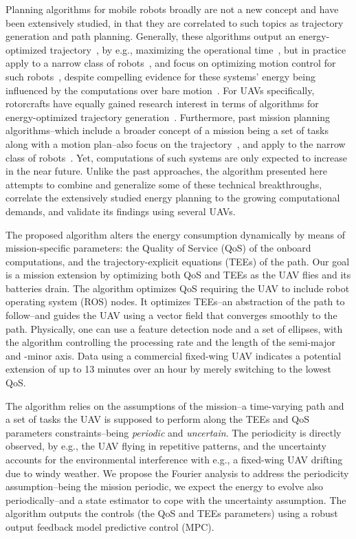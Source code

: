 \documentclass[letterpaper,10pt,conference]{ieeeconf}
\begin{document}
Planning algorithms for mobile robots broadly are not a new concept and have been extensively studied, in that they are correlated to such topics as trajectory generation and path planning. Generally, these algorithms output an energy-optimized trajectory~\cite{mei2004energy}, by e.g., maximizing the operational time~\cite{wahab2015energy}, but in practice apply to a narrow class of robots~\cite{kim2005energy}, and focus on optimizing motion control for such robots~\cite{kim2008minimum}, despite compelling evidence for these systems' energy being influenced by the computations over bare motion~\cite{mei2005case}. For UAVs specifically, rotorcrafts have equally gained research interest in terms of algorithms for energy-optimized trajectory generation~\cite{morbidi2016minimum,kreciglowa2017energy}. Furthermore, past mission planning algorithms--which include a broader concept of a mission being a set of tasks along with a motion plan--also focus on the trajectory~\cite{mei2005case,mei2006deployment}, and apply to the narrow class of robots~\cite{sadrpour2013mission,sadrpour2013experimental}. Yet, computations of such systems are only expected to increase in the near future. Unlike the past approaches, the algorithm presented here attempts to combine and generalize some of these technical breakthroughs, correlate the extensively studied energy planning to the growing computational demands, and validate its findings using several UAVs.

The proposed algorithm alters the energy consumption dynamically by means of mission-specific parameters: the Quality of Service (QoS) of the onboard computations, and the trajectory-explicit equations (TEEs) of the path. Our goal is a mission extension by optimizing both QoS and TEEs as the UAV flies and its batteries drain. The algorithm optimizes QoS requiring the UAV to include robot operating system (ROS) nodes. It optimizes TEEs--an abstraction of the path to follow--and guides the UAV using a vector field that converges smoothly to the path. Physically, one can use a feature detection node and a set of ellipses, with the algorithm controlling the processing rate and the length of the semi-major and -minor axis. Data using a commercial fixed-wing UAV indicates a potential extension of up to 13 minutes over an hour by merely switching to the lowest QoS.

The algorithm relies on the assumptions of the mission--a time-varying path and a set of tasks the UAV is supposed to perform along the TEEs and QoS parameters constraints--being \emph{periodic} and \emph{uncertain}. The periodicity is directly observed, by e.g., the UAV flying in repetitive patterns, and the uncertainty accounts for the environmental interference with e.g., a fixed-wing UAV drifting due to windy weather. We propose the Fourier analysis to address the periodicity assumption--being the mission periodic, we expect the energy to evolve also periodically--and a state estimator to cope with the uncertainty assumption. The algorithm outputs the controls (the QoS and TEEs parameters) using a robust output feedback model predictive control (MPC).
\end{document}
